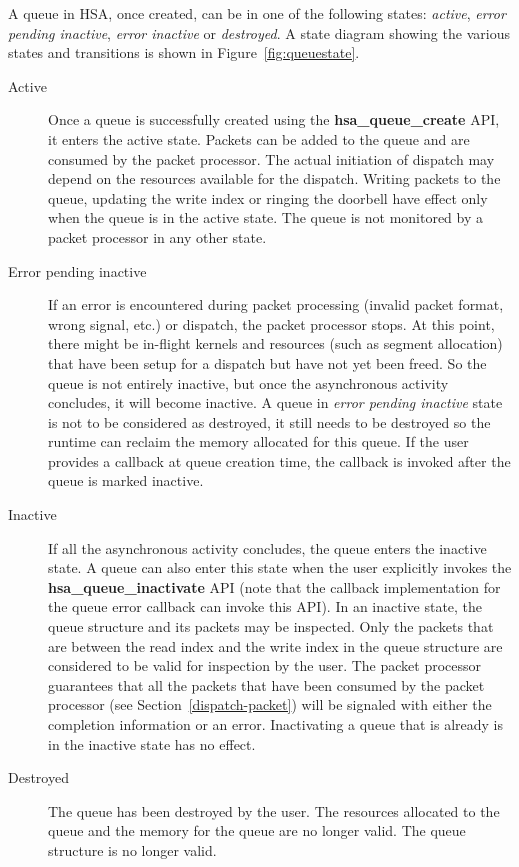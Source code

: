 \documentclass[final]{book}
\newcommand{\reffun}[1]{\textbf{#1}}
\begin{document}
A queue in HSA, once created, can be in one of the following states:
\emph{active}, \emph{error pending inactive}, \emph{error inactive} or
\emph{destroyed}. A state diagram showing the various states and transitions is
shown in Figure~\ref{fig:queuestate}.

\begin{description}
\item[Active] Once a queue is successfully created using the
  \reffun{hsa_queue_create} API, it enters the active state. Packets can be
  added to the queue and are consumed by the packet processor. The actual
  initiation of dispatch may depend on the resources available for the
  dispatch. Writing packets to the queue, updating the write index or ringing
  the doorbell have effect only when the queue is in the active state. The queue
  is not monitored by a packet processor in any other state.

\item[Error pending inactive] If an error is encountered during packet
  processing (invalid packet format, wrong signal, etc.) or dispatch, the packet
  processor stops. At this point, there might be in-flight kernels and resources
  (such as segment allocation) that have been setup for a dispatch but have not
  yet been freed. So the queue is not entirely inactive, but once the
  asynchronous activity concludes, it will become inactive. A queue in
  \emph{error pending inactive} state is not to be considered as destroyed, it
  still needs to be destroyed so the runtime can reclaim the memory allocated
  for this queue. If the user provides a callback at queue creation time, the
  callback is invoked after the queue is marked inactive.

\item[Inactive] If all the asynchronous activity concludes, the queue enters the
  inactive state. A queue can also enter this state when the user explicitly
  invokes the \reffun{hsa_queue_inactivate} API (note that the callback
  implementation for the queue error callback can invoke this API). In an
  inactive state, the queue structure and its packets may be inspected. Only the
  packets that are between the read index and the write index in the queue
  structure are considered to be valid for inspection by the user. The packet
  processor guarantees that all the packets that have been consumed by the
  packet processor (see Section~\ref{dispatch-packet}) will be signaled with
  either the completion information or an error. Inactivating a queue that is
  already is in the inactive state has no effect.

\item[Destroyed] The queue has been destroyed by the user. The resources
  allocated to the queue and the memory for the queue are no longer valid. The
  queue structure is no longer valid.
\end{description}
\end{document}
